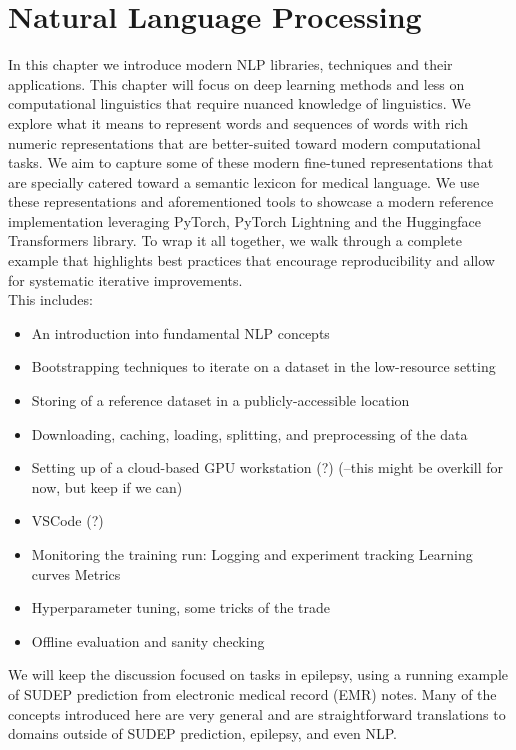 \chapter{Natural Language Processing}
In this chapter we introduce modern NLP libraries, techniques and their applications.
This chapter will focus on deep learning methods and less on computational linguistics that require nuanced knowledge of linguistics.
We explore what it means to represent words and sequences of words with rich numeric representations that are better-suited toward modern computational tasks.
We aim to capture some of these modern fine-tuned representations that are specially catered toward a semantic lexicon for medical language.
We use these representations and aforementioned tools to showcase a modern reference implementation leveraging PyTorch, PyTorch Lightning and the Huggingface Transformers library.
To wrap it all together, we walk through a complete example that highlights best practices that encourage reproducibility and allow for systematic iterative improvements.
\\

\noindent This includes:
\begin{itemize}
\item An introduction into fundamental NLP concepts
\item Bootstrapping techniques to iterate on a dataset in the low-resource setting
\item Storing of a reference dataset in a publicly-accessible location
\item Downloading, caching, loading, splitting, and preprocessing of the data
\item Setting up of a cloud-based GPU workstation (?) (--this might be overkill for now, but keep if we can)
\item VSCode (?)
\item Monitoring the training run:
  \subitem Logging and experiment tracking
  \subitem Learning curves
  \subitem Metrics
\item Hyperparameter tuning, some tricks of the trade
\item Offline evaluation and sanity checking
\end{itemize}
We will keep the discussion focused on tasks in epilepsy, using a running example of SUDEP prediction from electronic medical record (EMR) notes.
Many of the concepts introduced here are very general and are straightforward translations to domains outside of SUDEP prediction, epilepsy, and even NLP.

